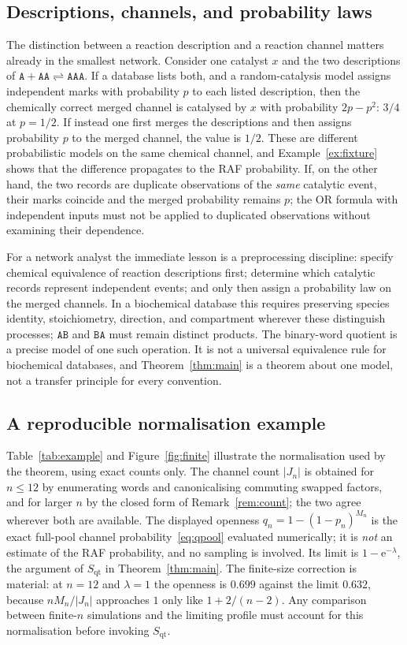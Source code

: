 \documentclass[11pt,a4paper]{article}
\theoremstyle{plain}
\theoremstyle{definition}
\theoremstyle{remark}
\newcommand{\qt}{\mathrm{qt}}
\newcommand{\ee}{\mathrm{e}}
\newcommand{\word}[1]{\mathtt{#1}}
\begin{document}
\subsection{Descriptions, channels, and probability laws}
The distinction between a reaction description and a reaction channel matters already in the smallest network. Consider one catalyst $x$ and the two descriptions of $\word A+\word{AA}\rightleftharpoons\word{AAA}$. If a database lists both, and a random-catalysis model assigns independent marks with probability $p$ to each listed description, then the chemically correct merged channel is catalysed by $x$ with probability $2p-p^2$: $3/4$ at $p=1/2$. If instead one first merges the descriptions and then assigns probability $p$ to the merged channel, the value is $1/2$. These are different probabilistic models on the same chemical channel, and Example~\ref{ex:fixture} shows that the difference propagates to the RAF probability. If, on the other hand, the two records are duplicate observations of the \emph{same} catalytic event, their marks coincide and the merged probability remains $p$; the OR formula with independent inputs must not be applied to duplicated observations without examining their dependence.

For a network analyst the immediate lesson is a preprocessing discipline: specify chemical equivalence of reaction descriptions first; determine which catalytic records represent independent events; and only then assign a probability law on the merged channels. In a biochemical database this requires preserving species identity, stoichiometry, direction, and compartment wherever these distinguish processes; $\word{AB}$ and $\word{BA}$ must remain distinct products. The binary-word quotient is a precise model of one such operation. It is not a universal equivalence rule for biochemical databases, and Theorem~\ref{thm:main} is a theorem about one model, not a transfer principle for every convention.

\subsection{A reproducible normalisation example}
Table~\ref{tab:example} and Figure~\ref{fig:finite} illustrate the normalisation used by the theorem, using exact counts only. The channel count $|J_n|$ is obtained for $n\le12$ by enumerating words and canonicalising commuting swapped factors, and for larger $n$ by the closed form of Remark~\ref{rem:count}; the two agree wherever both are available. The displayed openness $q_n=1-(1-p_n)^{M_n}$ is the exact full-pool channel probability~\eqref{eq:qpool} evaluated numerically; it is \emph{not} an estimate of the RAF probability, and no sampling is involved. Its limit is $1-\ee^{-\lambda}$, the argument of $S_{\qt}$ in Theorem~\ref{thm:main}. The finite-size correction is material: at $n=12$ and $\lambda=1$ the openness is $0.699$ against the limit $0.632$, because $nM_n/|J_n|$ approaches $1$ only like $1+2/(n-2)$. Any comparison between finite-$n$ simulations and the limiting profile must account for this normalisation before invoking $S_{\qt}$.
\end{document}
